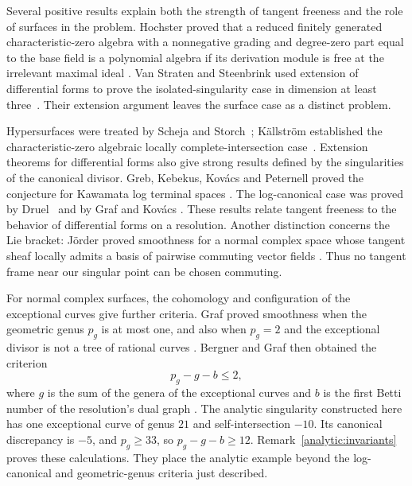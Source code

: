 Several positive results explain both the strength of tangent freeness
and the role of surfaces in the problem. Hochster proved that a reduced
finitely generated characteristic-zero algebra with a nonnegative grading
and degree-zero part equal to the base field is a polynomial algebra if
its derivation module is free at the irrelevant maximal ideal
\cite[\S1, Theorem]{Hochster1977}. Van Straten and Steenbrink used
extension of differential forms to prove the isolated-singularity case
in dimension at least three~\cite[Theorem~1.3 and~\S1.6]{VanStratenSteenbrink1985}.
Their extension argument leaves the surface case as a distinct problem.

Hypersurfaces were treated by Scheja and Storch~\cite[Satz~9.3]{SchejaStorch1972};
K\"allstr\"om established the characteristic-zero algebraic locally complete-intersection
case~\cite[Corollary~1.3(1), corrected version]{Kallstrom2011}.
Extension theorems for differential forms also give strong results defined
by the singularities of the canonical divisor. Greb, Kebekus, Kov\'acs and
Peternell proved the conjecture for Kawamata log terminal spaces
\cite[Theorem~6.1]{GKKP2011}. The log-canonical case was proved by
Druel~\cite[Theorem~1.1]{Druel2014} and by Graf and Kov\'acs
\cite[Corollary~1.3]{GrafKovacs2014}.
These results relate tangent freeness to the behavior of differential
forms on a resolution. Another distinction concerns the Lie bracket:
J\"order proved smoothness for a normal complex space whose tangent sheaf
locally admits a basis of pairwise commuting vector fields
\cite[Theorem~1.1]{Jorder2014}. Thus no tangent frame near our singular
point can be chosen commuting.

For normal complex surfaces, the cohomology and configuration of the
exceptional curves give further criteria. Graf proved smoothness when
the geometric genus $p_g$ is at most one, and also when $p_g=2$ and the
exceptional divisor is not a tree of rational curves
\cite[Theorem~1.1]{GrafLowGenus2021}. Bergner and Graf then obtained the
criterion
\[
 p_g-g-b\le2,
\]
where $g$ is the sum of the genera of the exceptional curves and $b$ is
the first Betti number of the resolution's dual graph
\cite[Theorem~1]{BergnerGraf2020}.
The analytic singularity constructed here has one exceptional curve of genus $21$
and self-intersection $-10$. Its canonical discrepancy is $-5$, and
$p_g\ge33$, so $p_g-g-b\ge12$. Remark~\ref{analytic:invariants}
proves these calculations. They place the analytic example beyond the
log-canonical and geometric-genus criteria just described.

